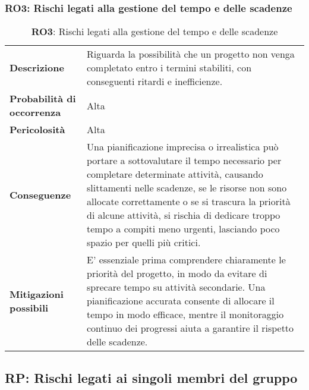\subsubsection{RO3: Rischi legati alla gestione del tempo e delle scadenze}
\label{sec:Rischi legati alla gestione del tempo e delle scadenze}
\begin{table}[h!]
    \centering
    \renewcommand{\arraystretch}{1.5} %
    \begin{tabularx}{\textwidth}{|X|X|}\hline
    \rowcolor[HTML]{FFD700} 
    \multicolumn{2}{|c|}{\textbf{Rischi legati alla gestione del tempo e delle scadenze}} \\ \hline
    \textbf{Descrizione} & Riguarda la possibilità che un progetto non venga completato entro i termini stabiliti, con conseguenti ritardi e inefficienze. \\ \hline
    \textbf{Probabilità di occorrenza} & Alta \\ \hline
    \textbf{Pericolosità} & Alta \\ \hline
    \textbf{Conseguenze} & Una pianificazione imprecisa o irrealistica può portare a sottovalutare il tempo necessario per completare determinate attività, causando slittamenti nelle scadenze,
    se le risorse non sono allocate correttamente o se si trascura la priorità di alcune attività, si rischia di dedicare troppo tempo a compiti meno urgenti, lasciando poco spazio per quelli più critici.\\ \hline
    \textbf{Mitigazioni possibili} & E' essenziale prima comprendere chiaramente le priorità del progetto, 
    in modo da evitare di sprecare tempo su attività secondarie. Una pianificazione accurata consente di allocare il tempo in modo efficace, 
    mentre il monitoraggio continuo dei progressi aiuta a garantire il rispetto delle scadenze. \\ \hline
    \end{tabularx}
    \caption{\textbf{RO3}: Rischi legati alla gestione del tempo e delle scadenze}
    \end{table}

\newpage

\subsection{RP: Rischi legati ai singoli membri del gruppo}

